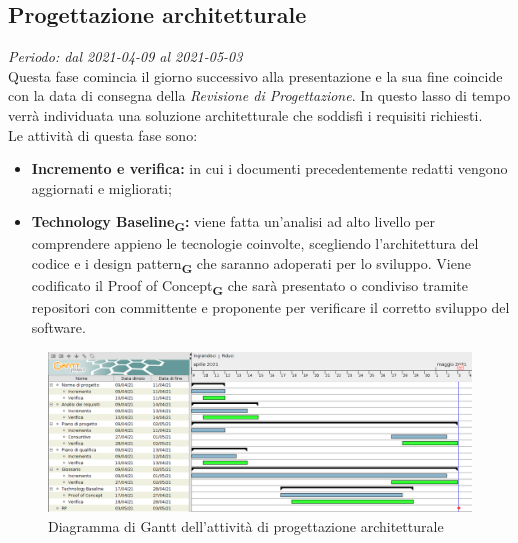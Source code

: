 \subsection{Progettazione architetturale}
\textit{Periodo: dal 2021-04-09 al 2021-05-03}\\
Questa fase comincia il giorno successivo alla presentazione e la sua fine coincide con la data di consegna della \textit{Revisione di Progettazione}. In questo lasso di tempo verrà individuata una soluzione architetturale che soddisfi i requisiti richiesti.\\
Le attività di questa fase sono:
\begin{itemize}
    \item \textbf{Incremento e verifica:} in cui i documenti precedentemente redatti vengono aggiornati e migliorati;
    \item \textbf{Technology Baseline\textsubscript{\textbf{G}}:} viene fatta un'analisi ad alto livello per comprendere appieno le tecnologie coinvolte, scegliendo l'architettura del codice e i design pattern\textsubscript{\textbf{G}} che saranno adoperati per lo sviluppo. Viene codificato il Proof of Concept\textsubscript{\textbf{G}} che sarà presentato o condiviso tramite repositori con committente e proponente per verificare il corretto sviluppo del software.
\end{itemize}
\begin{figure}[!ht]
    \caption{Diagramma di Gantt dell'attività di progettazione architetturale}
    \vspace{5px}
    \includegraphics[scale=0.3]{../../../Images/Diagrammi/Gantt/progettArchitetturale_v2.png}
    \centering
\end{figure}

